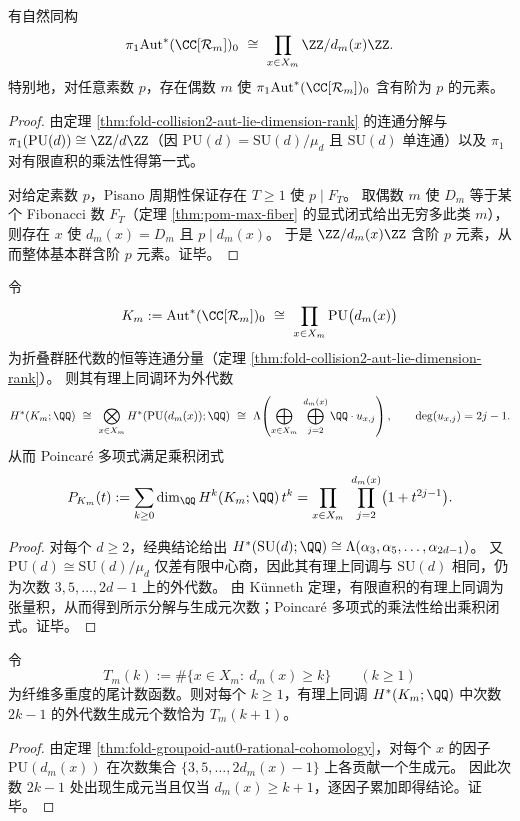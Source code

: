 \begin{proposition}[\(\pi_1\) 的纤维化循环分解与全素数挠性]\label{prop:fold-groupoid-aut-pi1-all-primes}
有自然同构
\[
\pi_1\mathrm{Aut}^{\ast}(\CC[\mathcal{R}_m])_0\ \cong\ \prod_{x\in X_m}\ZZ/d_m(x)\ZZ.
\]
特别地，对任意素数 \(p\)，存在偶数 \(m\) 使 \(\pi_1\mathrm{Aut}^{\ast}(\CC[\mathcal{R}_m])_0\) 含有阶为 \(p\) 的元素。
\end{proposition}
\begin{proof}
由定理 \ref{thm:fold-collision2-aut-lie-dimension-rank} 的连通分解与 \(\pi_1(\mathrm{PU}(d))\cong\ZZ/d\ZZ\)（因 \(\mathrm{PU}(d)=\mathrm{SU}(d)/\mu_d\) 且 \(\mathrm{SU}(d)\) 单连通）以及 \(\pi_1\) 对有限直积的乘法性得第一式。
\par
对给定素数 \(p\)，Pisano 周期性保证存在 \(T\ge 1\) 使 \(p\mid F_T\)。
取偶数 \(m\) 使 \(D_m\) 等于某个 Fibonacci 数 \(F_T\)（定理 \ref{thm:pom-max-fiber} 的显式闭式给出无穷多此类 \(m\)），则存在 \(x\) 使 \(d_m(x)=D_m\) 且 \(p\mid d_m(x)\)。
于是 \(\ZZ/d_m(x)\ZZ\) 含阶 \(p\) 元素，从而整体基本群含阶 \(p\) 元素。证毕。
\end{proof}

\begin{theorem}[退化谱决定连通连续对称的有理同伦型]\label{thm:fold-groupoid-aut0-rational-cohomology}
令
\[
K_m:=\mathrm{Aut}^{\ast}(\CC[\mathcal{R}_m])_0\ \cong\ \prod_{x\in X_m}\mathrm{PU}\bigl(d_m(x)\bigr)
\]
为折叠群胚代数的恒等连通分量（定理 \ref{thm:fold-collision2-aut-lie-dimension-rank}）。
则其有理上同调环为外代数
\[
H^\ast(K_m;\QQ)
\ \cong\
\bigotimes_{x\in X_m}H^\ast(\mathrm{PU}(d_m(x));\QQ)
\ \cong\
\Lambda\!\left(\bigoplus_{x\in X_m}\ \bigoplus_{j=2}^{d_m(x)} \QQ\cdot u_{x,j}\right),
\qquad
\deg(u_{x,j})=2j-1.
\]
从而 Poincar\'e 多项式满足乘积闭式
\[
P_{K_m}(t)
:=\sum_{k\ge 0}\dim_{\QQ}H^k(K_m;\QQ)\,t^k
=\prod_{x\in X_m}\ \prod_{j=2}^{d_m(x)}\bigl(1+t^{2j-1}\bigr).
\]
\end{theorem}
\begin{proof}
对每个 \(d\ge 2\)，经典结论给出 \(H^\ast(\mathrm{SU}(d);\QQ)\cong \Lambda(\alpha_3,\alpha_5,\dots,\alpha_{2d-1})\)。
又 \(\mathrm{PU}(d)\cong \mathrm{SU}(d)/\mu_d\) 仅差有限中心商，因此其有理上同调与 \(\mathrm{SU}(d)\) 相同，仍为次数 \(3,5,\dots,2d-1\) 上的外代数。
由 K\"unneth 定理，有限直积的有理上同调为张量积，从而得到所示分解与生成元次数；Poincar\'e 多项式的乘法性给出乘积闭式。证毕。
\end{proof}

\begin{corollary}[纤维谱尾分布的拓扑读出]\label{cor:fold-tail-topological-readout}
令
\[
T_m(k):=\#\{x\in X_m:\ d_m(x)\ge k\}\qquad(k\ge 1)
\]
为纤维多重度的尾计数函数。则对每个 \(k\ge 1\)，有理上同调 \(H^\ast(K_m;\QQ)\) 中次数 \(2k-1\) 的外代数生成元个数恰为 \(T_m(k+1)\)。
\end{corollary}
\begin{proof}
由定理 \ref{thm:fold-groupoid-aut0-rational-cohomology}，对每个 \(x\) 的因子 \(\mathrm{PU}(d_m(x))\) 在次数集合 \(\{3,5,\dots,2d_m(x)-1\}\) 上各贡献一个生成元。
因此次数 \(2k-1\) 处出现生成元当且仅当 \(d_m(x)\ge k+1\)，逐因子累加即得结论。证毕。
\end{proof}

